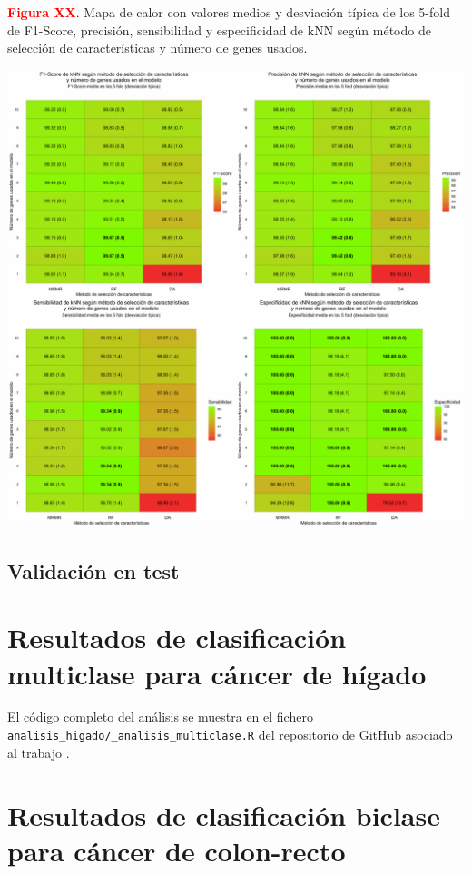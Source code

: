 \textbf{\textcolor{red}{Figura XX}}. Mapa de calor con valores medios y desviación típica de los 5-fold de F1-Score, precisión, sensibilidad y especificidad de kNN según método de selección de características y número de genes usados.
\begin{center}
	\includegraphics[width=1\textwidth]{figuras/higado_biclase_heatmap_knn.pdf} \\
\end{center}
\newpage

\subsection{Validación en test}

\section{Resultados de clasificación multiclase para cáncer de hígado}

El código completo del análisis se muestra en el fichero \texttt{analisis\_higado/\_analisis\_multiclase.R} del repositorio de GitHub asociado al trabajo \cite{Redondo-Sanchez2020}.\\

\section{Resultados de clasificación biclase para cáncer de colon-recto}

